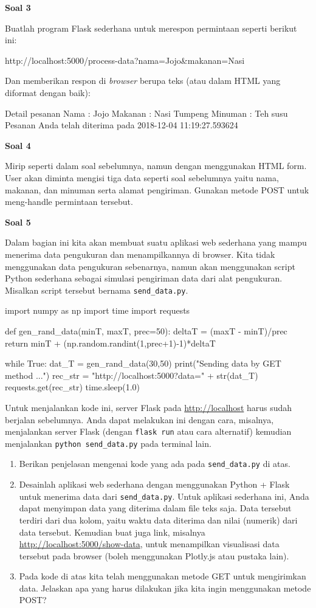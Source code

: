 \documentclass[a4paper,10pt]{extarticle}
\begin{document}
\textbf{Soal 3}

Buatlah program Flask sederhana untuk merespon permintaan seperti berikut ini:
\begin{textcode}
http://localhost:5000/process-data?nama=Jojo&makanan=Nasi%
\end{textcode}
Dan memberikan respon di \textit{browser}
berupa teks (atau dalam HTML yang diformat dengan baik):
\begin{textcode}
Detail pesanan
Nama : Jojo
Makanan : Nasi Tumpeng
Minuman : Teh susu
Pesanan Anda telah diterima pada 2018-12-04 11:19:27.593624 
\end{textcode}

\textbf{Soal 4}

Mirip seperti dalam soal sebelumnya, namun dengan menggunakan HTML form.
User akan diminta mengisi tiga data seperti soal sebelumnya
yaitu nama, makanan, dan minuman serta alamat pengiriman.
Gunakan metode POST untuk meng-handle permintaan tersebut.

\textbf{Soal 5}

Dalam bagian ini kita akan membuat suatu aplikasi web sederhana
yang mampu menerima data pengukuran dan menampilkannya di browser.
Kita tidak menggunakan data pengukuran sebenarnya, namun akan menggunakan
script Python sederhana sebagai simulasi pengiriman data dari alat pengukuran.
Misalkan script tersebut bernama \verb|send_data.py|.
\begin{pythoncode}
import numpy as np
import time
import requests

def gen_rand_data(minT, maxT, prec=50):
    deltaT = (maxT - minT)/prec
    return minT + (np.random.randint(1,prec+1)-1)*deltaT

while True:
    dat_T = gen_rand_data(30,50)
    print("Sending data by GET method ...")
    rec_str = "http://localhost:5000?data=" + str(dat_T)
    requests.get(rec_str)
    time.sleep(1.0)
\end{pythoncode}

Untuk menjalankan kode ini, server Flask pada \url{http://localhost}
harus sudah berjalan sebelumnya. Anda dapat melakukan ini dengan cara,
misalnya, menjalankan server Flask (dengan \texttt{flask run} atau cara
alternatif) kemudian menjalankan \texttt{python send\_data.py} pada
terminal lain.

\begin{enumerate}
\item Berikan penjelasan mengenai kode yang ada pada \verb|send_data.py| di atas.
\item Desainlah aplikasi web sederhana dengan menggunakan Python + Flask untuk
menerima data dari \verb|send_data.py|. Untuk aplikasi sederhana ini, Anda dapat
menyimpan data yang diterima dalam file teks saja. 
Data tersebut terdiri dari dua kolom, yaitu waktu data diterima dan nilai (numerik)
dari data tersebut.
Kemudian buat juga link, misalnya \url{http://localhost:5000/show-data},
untuk menampilkan visualisasi data tersebut pada browser
(boleh menggunakan \textsf{Plotly.js} atau pustaka lain).
\item Pada kode di atas kita telah menggunakan metode GET untuk mengirimkan data.
Jelaskan apa yang harus dilakukan jika kita ingin menggunakan metode POST?
\end{enumerate}
\end{document}
